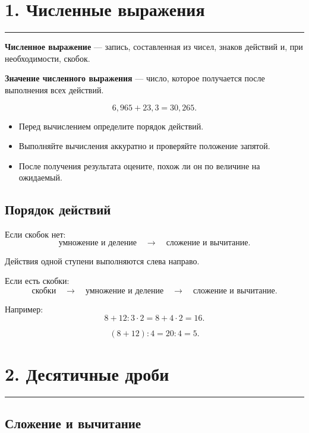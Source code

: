 \documentclass[a4paper,12pt]{article}
\newcommand{\sectionline}{%
    \vspace{-0.25em}
    {\color{accent}\rule{\linewidth}{0.7pt}}
    \vspace{0.3em}
}
\newcommand{\checkitem}{\item[\textcolor{accent}{$\checkmark$}]}
\begin{document}

\section*{\color{darkaccent}1. Численные выражения}
\sectionline

\textbf{Численное выражение} --- запись, составленная из чисел, знаков действий и, при необходимости, скобок.

\textbf{Значение численного выражения} --- число, которое получается после выполнения всех действий.

\[
6{,}965+23{,}3=30{,}265.
\]

\begin{itemize}
    \checkitem Перед вычислением определите порядок действий.
    \checkitem Выполняйте вычисления аккуратно и проверяйте положение запятой.
    \checkitem После получения результата оцените, похож ли он по величине на ожидаемый.
\end{itemize}

\subsection*{\color{accent}Порядок действий}

Если скобок нет:
\[
\boxed{\text{умножение и деление}}
\quad\longrightarrow\quad
\boxed{\text{сложение и вычитание}}.
\]

Действия одной ступени выполняются слева направо.

Если есть скобки:
\[
\boxed{\text{скобки}}
\quad\longrightarrow\quad
\boxed{\text{умножение и деление}}
\quad\longrightarrow\quad
\boxed{\text{сложение и вычитание}}.
\]

Например:
\[
8+12:3\cdot2=8+4\cdot2=16.
\]

\[
(8+12):4=20:4=5.
\]


\section*{\color{darkaccent}2. Десятичные дроби}
\sectionline

\subsection*{\color{accent}Сложение и вычитание}
\end{document}
